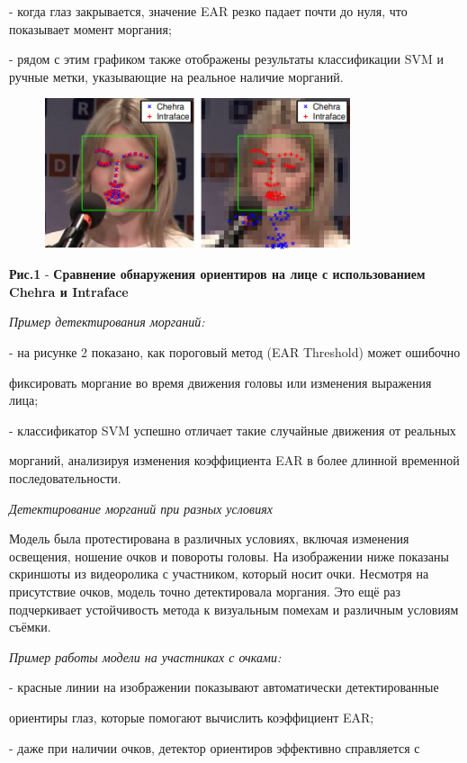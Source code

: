 - когда глаз закрывается, значение EAR резко падает почти до нуля, что
показывает момент моргания;

- рядом с этим графиком также отображены результаты классификации SVM и
ручные метки, указывающие на реальное наличие морганий.

\begin{figure}[H]
	\centering
	\includegraphics[width=0.8\textwidth]{media/ict/image15}
	\caption*{}
\end{figure}


{\bfseries Рис.1} - {\bfseries Сравнение обнаружения ориентиров на лице с
использованием Chehra и Intraface}

\emph{Пример детектирования морганий:}

- на рисунке 2 показано, как пороговый метод (EAR Threshold) может
ошибочно

фиксировать моргание во время движения головы или изменения выражения
лица;

- классификатор SVM успешно отличает такие случайные движения от
реальных

морганий, анализируя изменения коэффициента EAR в более длинной
временной последовательности.

\emph{Детектирование морганий при разных условиях}

Модель была протестирована в различных условиях, включая изменения
освещения, ношение очков и повороты головы. На изображении ниже показаны
скриншоты из видеоролика с участником, который носит очки. Несмотря на
присутствие очков, модель точно детектировала моргания. Это ещё раз
подчеркивает устойчивость метода к визуальным помехам и различным
условиям съёмки.

\emph{Пример работы модели на участниках с очками:}

- красные линии на изображении показывают автоматически детектированные

ориентиры глаз, которые помогают вычислить коэффициент EAR;

- даже при наличии очков, детектор ориентиров эффективно справляется с

